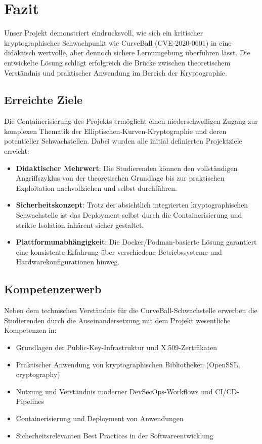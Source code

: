 \documentclass{article}
\begin{document}
\newpage

\section{Fazit}
Unser Projekt demonstriert eindrucksvoll, wie sich ein kritischer kryptographischer Schwachpunkt wie CurveBall (CVE-2020-0601) in eine didaktisch wertvolle, aber dennoch sichere Lernumgebung überführen lässt. Die entwickelte Lösung schlägt erfolgreich die Brücke zwischen theoretischem Verständnis und praktischer Anwendung im Bereich der Kryptographie.

\subsection{Erreichte Ziele}
Die Containerisierung des Projekts ermöglicht einen niederschwelligen Zugang zur komplexen Thematik der Elliptischen-Kurven-Kryptographie und deren potentieller Schwachstellen. Dabei wurden alle initial definierten Projektziele erreicht:

\begin{itemize}
  \item \textbf{Didaktischer Mehrwert}: Die Studierenden können den vollständigen Angriffszyklus von der theoretischen Grundlage bis zur praktischen Exploitation nachvollziehen und selbst durchführen.
  
  \item \textbf{Sicherheitskonzept}: Trotz der absichtlich integrierten kryptographischen Schwachstelle ist das Deployment selbst durch die Containerisierung und strikte Isolation inhärent sicher gestaltet.
  
  \item \textbf{Plattformunabhängigkeit}: Die Docker/Podman-basierte Lösung garantiert eine konsistente Erfahrung über verschiedene Betriebssysteme und Hardwarekonfigurationen hinweg.
\end{itemize}

\subsection{Kompetenzerwerb}
Neben dem technischen Verständnis für die CurveBall-Schwachstelle erwerben die Studierenden durch die Auseinandersetzung mit dem Projekt wesentliche Kompetenzen in:

\begin{itemize}
  \item Grundlagen der Public-Key-Infrastruktur und X.509-Zertifikaten
  \item Praktischer Anwendung von kryptographischen Bibliotheken (OpenSSL, cryptography)
  \item Nutzung und Verständnis moderner DevSecOps-Workflows und CI/CD-Pipelines
  \item Containerisierung und Deployment von Anwendungen
  \item Sicherheitsrelevanten Best Practices in der Softwareentwicklung
\end{itemize}
\end{document}
